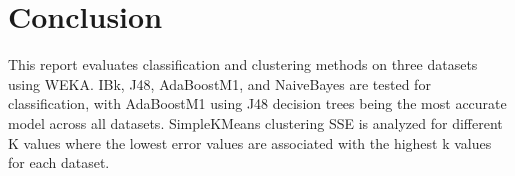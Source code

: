 \documentclass{article}
\begin{document}
\section{Conclusion}
This report evaluates classification and clustering methods on three datasets using WEKA. IBk, J48, AdaBoostM1, and NaiveBayes are
tested for classification, with AdaBoostM1 using J48 decision trees being the most accurate model across all datasets. SimpleKMeans clustering
SSE is analyzed for different K values where the lowest error values are associated with the highest k values for each dataset.
\end{document}
